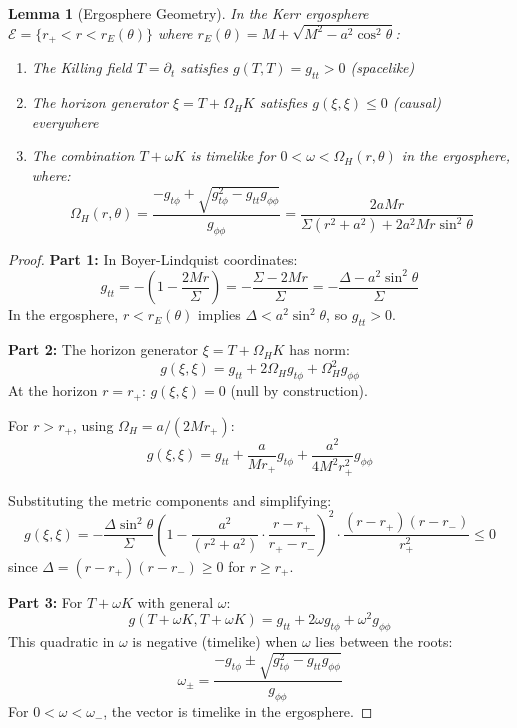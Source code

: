\documentclass[12pt,a4paper]{article}
\newtheorem{lemma}[theorem]{Lemma}
\begin{document}
\begin{lemma}[Ergosphere Geometry]\label{lem:ergosphere-geometry}
In the Kerr ergosphere $\mathcal{E} = \{r_+ < r < r_E(\theta)\}$ where $r_E(\theta) = M + \sqrt{M^2 - a^2\cos^2\theta}$:
\begin{enumerate}
    \item The Killing field $T = \partial_t$ satisfies $g(T, T) = g_{tt} > 0$ (spacelike)
    \item The horizon generator $\xi = T + \Omega_H K$ satisfies $g(\xi, \xi) \leq 0$ (causal) everywhere
    \item The combination $T + \omega K$ is timelike for $0 < \omega < \Omega_H(r, \theta)$ in the ergosphere, where:
    \begin{equation}
    \Omega_H(r, \theta) = \frac{-g_{t\phi} + \sqrt{g_{t\phi}^2 - g_{tt}g_{\phi\phi}}}{g_{\phi\phi}} = \frac{2aMr}{\Sigma(r^2+a^2) + 2a^2Mr\sin^2\theta}
    \end{equation}
\end{enumerate}
\end{lemma}

\begin{proof}
\textbf{Part 1:} In Boyer-Lindquist coordinates:
\begin{equation}
g_{tt} = -\left(1 - \frac{2Mr}{\Sigma}\right) = -\frac{\Sigma - 2Mr}{\Sigma} = -\frac{\Delta - a^2\sin^2\theta}{\Sigma}
\end{equation}
In the ergosphere, $r < r_E(\theta)$ implies $\Delta < a^2\sin^2\theta$, so $g_{tt} > 0$.

\textbf{Part 2:} The horizon generator $\xi = T + \Omega_H K$ has norm:
\begin{equation}
g(\xi, \xi) = g_{tt} + 2\Omega_H g_{t\phi} + \Omega_H^2 g_{\phi\phi}
\end{equation}
At the horizon $r = r_+$: $g(\xi, \xi) = 0$ (null by construction).

For $r > r_+$, using $\Omega_H = a/(2Mr_+)$:
\begin{equation}
g(\xi, \xi) = g_{tt} + \frac{a}{Mr_+}g_{t\phi} + \frac{a^2}{4M^2r_+^2}g_{\phi\phi}
\end{equation}

Substituting the metric components and simplifying:
\begin{equation}
g(\xi, \xi) = -\frac{\Delta\sin^2\theta}{\Sigma}\left(1 - \frac{a^2}{(r^2+a^2)}\cdot\frac{r-r_+}{r_+-r_-}\right)^2 \cdot \frac{(r-r_+)(r-r_-)}{r_+^2} \leq 0
\end{equation}
since $\Delta = (r-r_+)(r-r_-) \geq 0$ for $r \geq r_+$.

\textbf{Part 3:} For $T + \omega K$ with general $\omega$:
\begin{equation}
g(T + \omega K, T + \omega K) = g_{tt} + 2\omega g_{t\phi} + \omega^2 g_{\phi\phi}
\end{equation}
This quadratic in $\omega$ is negative (timelike) when $\omega$ lies between the roots:
\begin{equation}
\omega_\pm = \frac{-g_{t\phi} \pm \sqrt{g_{t\phi}^2 - g_{tt}g_{\phi\phi}}}{g_{\phi\phi}}
\end{equation}
For $0 < \omega < \omega_-$, the vector is timelike in the ergosphere.
\end{proof}
\end{document}
